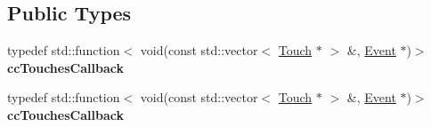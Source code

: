 \subsection*{Public Types}
\begin{DoxyCompactItemize}
\item 
\mbox{\label{classEventListenerTouchAllAtOnce_a1a653365bcd7a834f8a7e8040f252814}} 
typedef std\+::function$<$ void(const std\+::vector$<$ \hyperlink{classTouch}{Touch} $\ast$ $>$ \&, \hyperlink{classEvent}{Event} $\ast$)$>$ {\bfseries cc\+Touches\+Callback}
\item 
\mbox{\label{classEventListenerTouchAllAtOnce_a1a653365bcd7a834f8a7e8040f252814}} 
typedef std\+::function$<$ void(const std\+::vector$<$ \hyperlink{classTouch}{Touch} $\ast$ $>$ \&, \hyperlink{classEvent}{Event} $\ast$)$>$ {\bfseries cc\+Touches\+Callback}
\end{DoxyCompactItemize}
